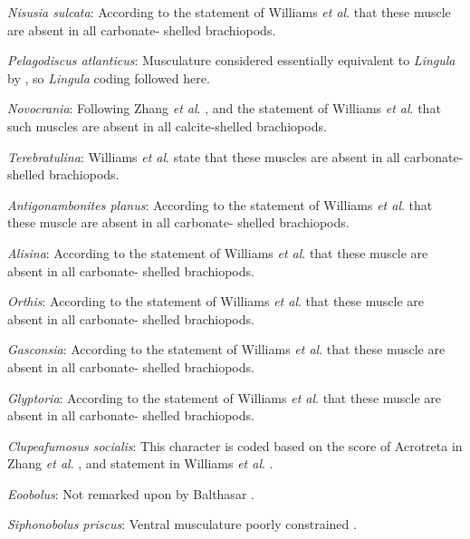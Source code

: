 \documentclass[]{book}
\theoremstyle{definition}
\theoremstyle{definition}
\theoremstyle{definition}
\theoremstyle{remark}
\begin{document}
\emph{Nisusia sulcata}: According to the statement of Williams \emph{et
al}. \citeyearpar[P.32]{Williams2000BrachiopodaLinguliformea} that these
muscle are absent in all carbonate- shelled brachiopods.

\emph{Pelagodiscus atlanticus}: Musculature considered essentially
equivalent to \emph{Lingula} by
\citet{Williams2000BrachiopodaLinguliformea}, so \emph{Lingula} coding
followed here.

\emph{Novocrania}: Following Zhang \emph{et al}.
\citeyearpar{Zhang2014Anearly}, and the statement of Williams \emph{et
al}. \citeyearpar{Williams2000BrachiopodaLinguliformea} that such
muscles are absent in all calcite-shelled brachiopods.

\emph{Terebratulina}: Williams \emph{et al}.
\citeyearpar[P.32]{Williams2000BrachiopodaLinguliformea} state that
these muscles are absent in all carbonate-shelled brachiopods.

\emph{Antigonambonites planus}: According to the statement of Williams
\emph{et al}. \citeyearpar[P.32]{Williams2000BrachiopodaLinguliformea}
that these muscle are absent in all carbonate- shelled brachiopods.

\emph{Alisina}: According to the statement of Williams \emph{et al}.
\citeyearpar[P.32]{Williams2000BrachiopodaLinguliformea} that these
muscle are absent in all carbonate- shelled brachiopods.

\emph{Orthis}: According to the statement of Williams \emph{et al}.
\citeyearpar[P.32]{Williams2000BrachiopodaLinguliformea} that these
muscle are absent in all carbonate- shelled brachiopods.

\emph{Gasconsia}: According to the statement of Williams \emph{et al}.
\citeyearpar[P.32]{Williams2000BrachiopodaLinguliformea} that these
muscle are absent in all carbonate- shelled brachiopods.

\emph{Glyptoria}: According to the statement of Williams \emph{et al}.
\citeyearpar[P.32]{Williams2000BrachiopodaLinguliformea} that these
muscle are absent in all carbonate- shelled brachiopods.

\emph{Clupeafumosus socialis}: This character is coded based on the
score of Acrotreta in Zhang \emph{et al}.
\citeyearpar{Zhang2014Anearly}, and statement in Williams \emph{et al}.
\citeyearpar[P.32]{Williams2000BrachiopodaLinguliformea}.

\emph{Eoobolus}: Not remarked upon by Balthasar
\citeyearpar{Balthasar2009Thebrachiopod}.

\emph{Siphonobolus priscus}: Ventral musculature poorly constrained
\citep{Williams2000BrachiopodaLinguliformea, Popov2009Earlyontogeny}.
\end{document}
